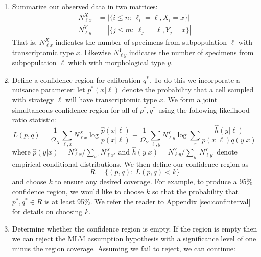 \begin{enumerate}
    \item Summarize our observed data in two matrices:
    \begin{align*}
    N^X_{\ell x} &= |\{i\leq n:\ \ell_i=\ell,X_i=x\}|\\
    N^Y_{\ell y} &= |\{j\leq m:\ \ell_j=\ell,Y_j=x\}|
    \end{align*}
    That is, $N^X_{\ell x}$ indicates the number of specimens from subpopulation $\ell$ with transcriptomic type $x$.  Likewise $N^Y_{\ell y}$ indicates the number of specimens from subpopulation $\ell$ which with morphological type $y$.  

    \item Define a confidence region for calibration $q^*$.  To do this we incorporate a nuisance parameter: let $p^*(x|\ell)$ denote the probability that a cell sampled with strategy $\ell$ will have transcriptomic type $x$.  We form a joint simultaneous confidence region for all of $p^*,q^*$ using the following likelihood ratio statistic:
    \[
    L(p,q)=\frac{1}{\Omega_X}\sum_{\ell,x} N^X_{\ell x} \log \frac{\hat p(x|\ell)}{p(x|\ell)} + \frac{1}{\Omega_Y}\sum_{\ell,y} N^Y_{\ell y} \log \sum_x \frac{\hat h(y|\ell)}{p(x|\ell) q(y|x)}
    \]
    where $\hat p(y|x)=N^X_{\ell x} / \sum_{x'}N^X_{\ell x'}$ and $\hat h(y|x)=N^Y_{\ell y} / \sum_{y'}N^Y_{\ell y'}$ denote empirical conditional distributions.  We then define our confidence region as 
    \[
    R = \{(p,q):\ L(p,q) < k\}
    \]
    and choose $k$ to ensure any desired coverage.  For example, to produce a 95\% confidence region, we would like to choose $k$ so that the probability that $p^*,q^* \in R$ is at least 95\%.  We refer the reader to Appendix \ref{sec:confinterval} for details on choosing $k$.
    
    \item Determine whether the confidence region is empty.  If the region is empty then we can reject the MLM assumption hypothesis with a significance level of one minus the region coverage.  Assuming we fail to reject, we can continue:
    

\end{enumerate}
